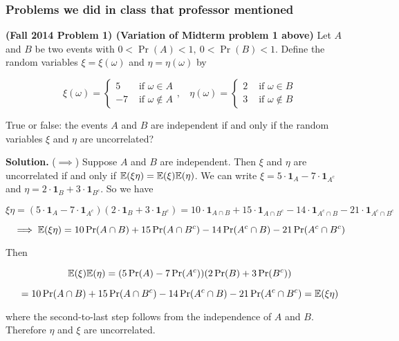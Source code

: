 

\subsubsection{Problems we did in class that professor mentioned}

\textbf{(Fall 2014 Problem 1) (Variation of Midterm problem 1 above)} Let \(A\) and \(B\) be two events with \(0 < \Pr(A) < 1, \ 0 < \Pr(B) < 1\). Define the random variables \(\xi = \xi(\omega)\) and \(\eta = \eta(\omega)\) by

\[
\xi(\omega) = \begin{cases} 
      5 & \text{ if } \omega \in A \\
      -7 &  \text{ if } \omega \notin A 
   \end{cases}, \ \ \ \ \eta(\omega) = \begin{cases} 
      2 & \text{ if } \omega \in B \\
      3 &  \text{ if } \omega \notin B 
   \end{cases}
\]

True or false: the events \(A\) and \(B\) are independent if and only if the random variables \(\xi\) and \(\eta\) are uncorrelated?

\textbf{Solution.} (\(\implies\)) Suppose \(A\) and \(B\) are independent. Then \(\xi\) and \(\eta\) are uncorrelated if and only if \(\E(\xi \eta ) = \E(\xi) \E(\eta)\). We can write \(\xi = 5 \cdot \boldsymbol{1}_A - 7 \cdot \boldsymbol{1}_{A^c}\) and \(\eta = 2 \cdot \boldsymbol{1}_B + 3 \cdot \boldsymbol{1}_{B^c}\). So we have

\[
\xi \eta = (5 \cdot \boldsymbol{1}_A - 7 \cdot \boldsymbol{1}_{A^c})(2 \cdot \boldsymbol{1}_B + 3 \cdot \boldsymbol{1}_{B^c}) = 10 \cdot \boldsymbol{1}_{A \cap B} +15 \cdot \boldsymbol{1}_{A \cap B^c} - 14 \cdot \boldsymbol{1}_{A^c \cap B} - 21 \cdot \boldsymbol{1}_{A^c \cap B^c}
\]

\[
\implies \E(\xi \eta ) = 10 \Pr(A \cap B) +15\Pr(A \cap B^c) - 14 \Pr(A^c \cap B) - 21\Pr(A^c \cap B^c)
\]

Then

\[
\E(\xi) \E(\eta) = (5 \Pr(A) - 7 \Pr(A^c))(2 \Pr(B) + 3 \Pr(B^c)) 
\]

\[
= 10\Pr(A \cap B) + 15 \Pr(A \cap B^c) - 14 \Pr(A^c \cap B) - 21 \Pr(A^c \cap B^c) = \E(\xi \eta )
\]

where the second-to-last step follows from the independence of \(A\) and \(B\). Therefore \(\eta\) and \(\xi\) are uncorrelated.


